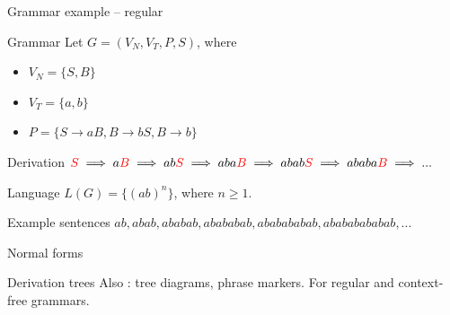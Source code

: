 \documentclass{beamer}
\begin{document}
\begin{frame}{Grammar example -- regular}
	
	\begin{block}{Grammar}
		Let $G = (V_N, V_T, P, S)$, where 
		\begin{itemize}
			\item $V_N = \{S, B\}$
			\item $V_T = \{a,b\}$
			\item $P = \{S \rightarrow aB, B \rightarrow bS, B \rightarrow b\}$
		\end{itemize}
	\end{block}
	
	\begin{block}{Derivation}
		$\textcolor{red}{S} \implies a\textcolor{red}{B} \implies ab\textcolor{red}{S} \implies aba\textcolor{red}{B} \implies abab\textcolor{red}{S} \implies ababa\textcolor{red}{B} \implies ...$
	\end{block}
	
	\begin{block}{Language}
		$L(G) = \{(ab)^n\}$, where $n\geq 1$.
	\end{block}
	
	\begin{exampleblock}{Example sentences}
		$ab, abab, ababab, abababab, ababababab, abababababab, ...$
	\end{exampleblock}
	
\end{frame}

\begin{frame}{Normal forms}

\end{frame}

\begin{frame}{Derivation trees}
	Also : tree diagrams, phrase markers. For regular and context-free grammars.
\end{frame}

\end{document}
